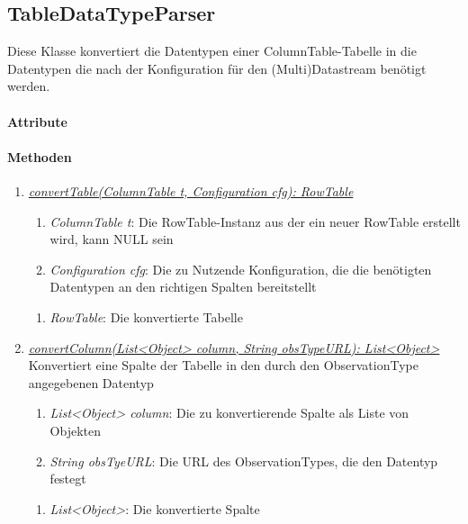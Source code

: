 \subsection{TableDataTypeParser}

Diese Klasse konvertiert die Datentypen einer ColumnTable-Tabelle in die Datentypen die nach der Konfiguration für den (Multi)Datastream benötigt werden.

\paragraph{Attribute}

\paragraph{Methoden}

\begin{enumerate}[+]
	\item \underline{\textit{convertTable(ColumnTable t, Configuration cfg): RowTable}} \\	
	\begin{enumerate}[$\bullet$]
		\item \textit{ColumnTable t}: Die RowTable-Instanz aus der ein neuer RowTable erstellt wird, kann NULL sein
		\item \textit{Configuration cfg}: Die zu Nutzende Konfiguration, die die benötigten Datentypen an den richtigen Spalten bereitstellt
	\end{enumerate}
	\vspace{-0.2cm}
	\begin{enumerate}[$\circ$]
		\item \textit{RowTable}: Die konvertierte Tabelle
	\end{enumerate}

	\item \underline{\textit{convertColumn(List<Object> column, String obsTypeURL): List<Object>}} \\
	Konvertiert eine Spalte der Tabelle in den durch den ObservationType angegebenen Datentyp
	\begin{enumerate}[$\bullet$]
		\item \textit{List<Object> column}: Die zu konvertierende Spalte als Liste von Objekten
		\item \textit{String obsTyeURL}: Die URL des ObservationTypes, die den Datentyp festegt
	\end{enumerate}
	\vspace{-0.2cm}
	\begin{enumerate}[$\circ$]
		\item \textit{List<Object>}: Die konvertierte Spalte
	\end{enumerate}
\end{enumerate}
